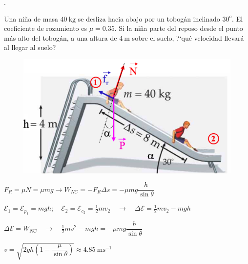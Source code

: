 \vspace{15mm} %
\begin{prob}.
\begin{multicols}{2}
Una niña de masa $40\ \mathrm{kg}$ se desliza hacia abajo por un tobogán inclinado $30^o$. El coeficiente de rozamiento es $\mu=0.35$. Si la niña parte del reposo desde el punto más alto del tobogán, a una altura de $4 \ \mathrm{m} $ sobre el suelo, ?`qué velocidad llevará al llegar al suelo?
	\begin{figure}[H]
	\centering
	\includegraphics[width=.55\textwidth]{imagenes/imagenes04/T04IM12.png}
\end{figure}
\end{multicols}
\end{prob}

$F_R=\mu N=\mu m g \to W_{NC}=-F_R \Delta s=-\mu m g \dfrac {h}{\sin \theta}$

$\mathcal E_1=\mathcal E_{p_1}=mgh;\quad \mathcal E_2=\mathcal E_{c_2}=\frac 1 2 m v_2 \quad \to \quad \Delta \mathcal E=\frac 1 2 m v_2 - mgh$

$\Delta \mathcal E=W_{NC} \quad \to \quad \frac 1 2 m v^2-mgh=-\mu m g \dfrac {h}{\sin \theta}$

$v=\sqrt{2gh\left(1-\dfrac {\mu}{\sin \theta}  \right)}\approx 4.85\ \mathrm{ms}^{-1}$

